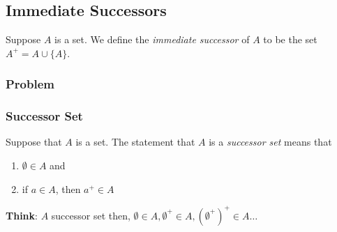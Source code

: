     \subsection{Immediate Successors}

        \begin{definition}
            Suppose $A$ is a set. We define the \textit{immediate successor} of $A$ to be the set $A^+ = A \cup \{A\}$.
        \end{definition}

        \subsubsection{Problem}




        \subsubsection{Successor Set}

            \begin{definition}
                Suppose that $A$ is a set. The statement that $A$ is a \textit{successor set} means that \begin{enumerate}
                    \item $\emptyset \in A$ and 
                    \item if $a\in A$, then $a^+ \in A$
                \end{enumerate}
            \end{definition}

            \textbf{Think}: $A$ successor set then, $\emptyset \in A, \emptyset^+\in A, (\emptyset^+)^+\in A \dots$

    